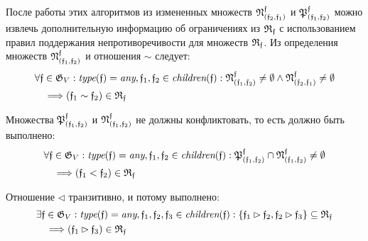 
После работы этих алгоритмов из измененных множеств $\mathfrak{N}^{\mathfrak{f}}_{(\mathfrak{f}_2, \mathfrak{f}_1)}$ и $\mathfrak{P}^{\mathfrak{f}}_{(\mathfrak{f}_1, \mathfrak{f}_2)}$ можно извлечь дополнительную информацию об ограничениях из $\mathfrak{R}_{\mathfrak{f}}$ с использованием правил поддержания непротиворечивости для множеств $\mathfrak{R}_{\mathfrak{f}}$. Из определения множеств $\mathfrak{N}^{\mathfrak{f}}_{(\mathfrak{f}_1, \mathfrak{f}_2)}$ и отношения $\sim$ следует:
\begin{equation}\label{eq:gf_consistency_1}
\begin{aligned}
&\forall \mathfrak{f} \in \mathfrak{G}_V: \textit{type}(\mathfrak{f}) = \textit{any}, \mathfrak{f}_1, \mathfrak{f}_2 \in \textit{children}(\mathfrak{f}): \mathfrak{N}^{\mathfrak{f}}_{(\mathfrak{f}_1, \mathfrak{f}_2)} \ne \emptyset \wedge \mathfrak{N}^{\mathfrak{f}}_{(\mathfrak{f}_2, \mathfrak{f}_1)} \ne \emptyset \\
&\quad \Longrightarrow (\mathfrak{f}_1 \sim \mathfrak{f}_2) \in \mathfrak{R}_{\mathfrak{f}}
\end{aligned}
\end{equation}

Множества $\mathfrak{P}^{\mathfrak{f}}_{(\mathfrak{f}_1, \mathfrak{f}_2)}$ и $\mathfrak{N}^{\mathfrak{f}}_{(\mathfrak{f}_1, \mathfrak{f}_2)}$ не должны конфликтовать, то есть должно быть выполнено:
\begin{equation}\label{eq:gf_consistency_2}
\begin{aligned}
&\forall \mathfrak{f} \in \mathfrak{G}_V: \textit{type}(\mathfrak{f}) = \textit{any}, \mathfrak{f}_1, \mathfrak{f}_2 \in \textit{children}(\mathfrak{f}): \mathfrak{P}^{\mathfrak{f}}_{(\mathfrak{f}_1, \mathfrak{f}_2)} \cap \mathfrak{N}^{\mathfrak{f}}_{(\mathfrak{f}_1, \mathfrak{f}_2)} \ne \emptyset \\
&\quad \Longrightarrow (\mathfrak{f}_1 < \mathfrak{f}_2) \in \mathfrak{R}_{\mathfrak{f}}
\end{aligned}
\end{equation}

Отношение $\lhd$ транзитивно, и потому выполнено:
\begin{equation}\label{eq:gf_consistency_3}
\begin{aligned}
&\exists \gf \in \gG_V: \type(\gf) = \any, \gf_1, \gf_2, \gf_3 \in \children(\gf): \{\gf_1 \rhd \gf_2, \gf_2 \rhd \gf_3\} \subseteq \gR_{\gf} \\
&\quad \Longrightarrow (\gf_1 \rhd \gf_3) \in \gR_{\gf} %
\end{aligned}
\end{equation}

